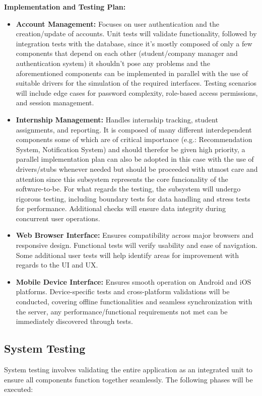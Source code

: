 \documentclass[11pt,twoside]{article}
\begin{document}
\textbf{Implementation and Testing Plan:}
\begin{itemize}
    \item \textbf{Account Management:} Focuses on user authentication and the creation/update of accounts. Unit tests will validate functionality, followed by integration tests with the database, since it's mostly composed of only a few components that depend on each other (student/company manager and authentication system) it shouldn't pose any problems and the aforementioned components can be implemented in parallel with the use of suitable drivers for the simulation of the required interfaces. Testing scenarios will include edge cases for password complexity, role-based access permissions, and session management.
    \item \textbf{Internship Management:} Handles internship tracking, student assignments, and reporting. It is composed of many different interdependent components some of which are of critical importance (e.g.: Recommendation System, Notification System) and should therefor be given high priority, a parallel implementation plan can also be adopted in this case with the use of drivers/stubs whenever needed but should be proceeded with utmost care and attention since this subsystem represents the core funcionality of the software-to-be. For what regards the testing, the subsystem will undergo rigorous testing, including boundary tests for data handling and stress tests for performance. Additional checks will ensure data integrity during concurrent user operations.
    \item \textbf{Web Browser Interface:} Ensures compatibility across major browsers and responsive design. Functional tests will verify usability and ease of navigation. Some additional user tests will help identify areas for improvement with regards to the UI and UX.
    \item \textbf{Mobile Device Interface:} Ensures smooth operation on Android and iOS platforms. Device-specific tests and cross-platform validations will be conducted, covering offline functionalities and seamless synchronization with the server, any performance/functional requirements not met can be immediately discovered through tests.
\end{itemize}


\subsection{System Testing}
System testing involves validating the entire application as an integrated unit to ensure all components function together seamlessly. The following phases will be executed:
\end{document}
